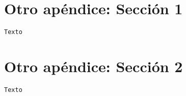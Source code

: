 \section{Otro apéndice: Sección 1}
\label{Apendice2:label}

\begin{center}
\begin{footnotesize}

\begin{verbatim}
Texto
\end{verbatim}

\end{footnotesize}
\end{center}

\section{Otro apéndice: Sección 2}
\label{Apendice2:label2}

\begin{center}
\begin{footnotesize}

\begin{verbatim}
Texto
\end{verbatim}


\end{footnotesize}
\end{center}
